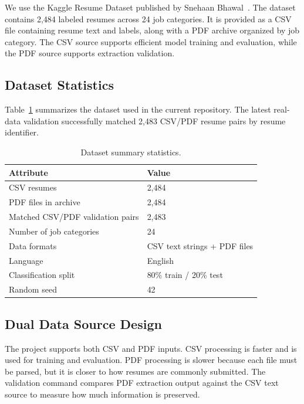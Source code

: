 \documentclass[sigconf, authorversion, nonacm]{acmart}
\begin{document}
We use the Kaggle Resume Dataset published by Snehaan Bhawal~\cite{bhawal2023}. The dataset contains 2,484 labeled resumes across 24 job categories. It is provided as a CSV file containing resume text and labels, along with a PDF archive organized by job category. The CSV source supports efficient model training and evaluation, while the PDF source supports extraction validation.

\subsection{Dataset Statistics}

Table~\ref{tab:dataset} summarizes the dataset used in the current repository. The latest real-data validation successfully matched 2,483 CSV/PDF resume pairs by resume identifier.

\begin{table}[t]
  \centering
  \caption{Dataset summary statistics.}
  \label{tab:dataset}
  \small
  \begin{tabular}{ll}
    \toprule
    \textbf{Attribute} & \textbf{Value} \\
    \midrule
    CSV resumes & 2,484 \\
    PDF files in archive & 2,484 \\
    Matched CSV/PDF validation pairs & 2,483 \\
    Number of job categories & 24 \\
    Data formats & CSV text strings + PDF files \\
    Language & English \\
    Classification split & 80\% train / 20\% test \\
    Random seed & 42 \\
    \bottomrule
  \end{tabular}
\end{table}

\subsection{Dual Data Source Design}

The project supports both CSV and PDF inputs. CSV processing is faster and is used for training and evaluation. PDF processing is slower because each file must be parsed, but it is closer to how resumes are commonly submitted. The validation command compares PDF extraction output against the CSV text source to measure how much information is preserved.
\end{document}
